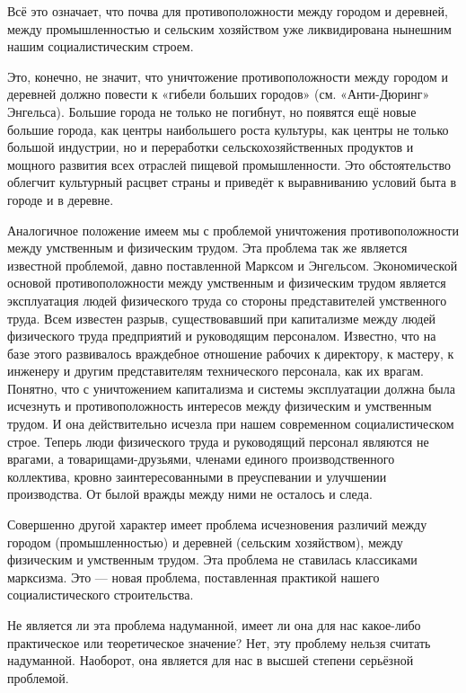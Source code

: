 \documentclass[12pt, a4paper, openany]{book}
\begin{document}
Всё это означает, что почва для противоположности между городом и деревней, между промышленностью и сельским хозяйством уже ликвидирована нынешним нашим социалистическим строем.



Это, конечно, не значит, что уничтожение противоположности между городом и деревней должно повести к «гибели больших городов» (см. «Анти-Дюринг» Энгельса). Большие города не только не погибнут, но появятся ещё новые большие города, как центры наибольшего роста культуры, как центры не только большой индустрии, но и переработки сельскохозяйственных продуктов и мощного развития всех отраслей пищевой промышленности. Это обстоятельство облегчит культурный расцвет страны и приведёт к выравниванию условий быта в городе и в деревне.



Аналогичное положение имеем мы с проблемой уничтожения противоположности между умственным и физическим трудом. Эта проблема так же является известной проблемой, давно поставленной Марксом и Энгельсом. Экономической основой противоположности между умственным и физическим трудом является эксплуатация людей физического труда со стороны представителей умственного труда. Всем известен разрыв, существовавший при капитализме между людей физического труда предприятий и руководящим персоналом. Известно, что на базе этого развивалось враждебное отношение рабочих к директору, к мастеру, к инженеру и другим представителям технического персонала, как их врагам. Понятно, что с уничтожением капитализма и системы эксплуатации должна была исчезнуть и противоположность интересов между физическим и умственным трудом. И она действительно исчезла при нашем современном социалистическом строе. Теперь люди физического труда и руководящий персонал являются не врагами, а товарищами-друзьями, членами единого производственного коллектива, кровно заинтересованными в преуспевании и улучшении производства. От былой вражды между ними не осталось и следа.



Совершенно другой характер имеет проблема исчезновения различий между городом (промышленностью) и деревней (сельским хозяйством), между физическим и умственным трудом. Эта проблема не ставилась классиками марксизма. Это — новая проблема, поставленная практикой нашего социалистического строительства.



Не является ли эта проблема надуманной, имеет ли она для нас какое-либо практическое или теоретическое значение? Нет, эту проблему нельзя считать надуманной. Наоборот, она является для нас в высшей степени серьёзной проблемой.
\end{document}
